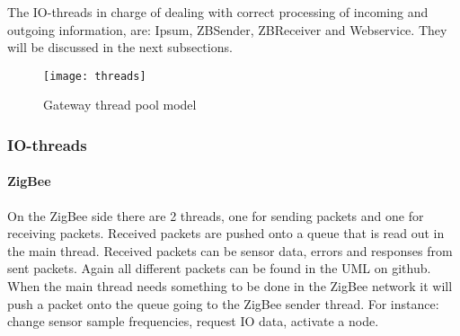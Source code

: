 The IO-threads in charge of dealing with correct processing of incoming and outgoing information, are: Ipsum, ZBSender, ZBReceiver and Webservice. They will be discussed in the next subsections.
\begin{figure}[t]
\centering
\texttt{[image: threads]}
\caption{Gateway thread pool model}
\label{fig:threads}
\end{figure} 
\subsubsection{IO-threads}
\paragraph{ZigBee}
On the ZigBee side there are 2 threads, one for sending packets and one for receiving packets. Received packets are pushed onto a queue that is read out in the main thread. Received packets can be sensor data, errors and responses from sent packets. Again all different packets can be found in the UML on github. When the main thread needs something to be done in the ZigBee network it will push a packet onto the queue going to the ZigBee sender thread. For instance: change sensor sample frequencies, request IO data, activate a node.

